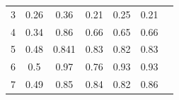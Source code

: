 \documentclass[twoside,11pt]{article}
\begin{document}
\begin{table}[H]
{\begin{tabular}{|c|c|c|c|c|c|c|}
3     & 0.26                                                           & 0.36                                                                                     & 0.21                                                                               & 0.25                                                                               & 0.21                                                                               &                                                                                       \\ \cline{1-1}
4     & 0.34                                                           & 0.86                                                                                     & 0.66                                                                               & 0.65                                                                               & 0.66                                                                               &                                                                                       \\ \cline{1-1}
5     & 0.48                                                           & 0.841                                                                                    & 0.83                                                                               & 0.82                                                                               & 0.83                                                                               &                                                                                       \\ \cline{1-1}
6     & 0.5                                                            & 0.97                                                                                     & 0.76                                                                               & 0.93                                                                               & 0.93                                                                               &                                                                                       \\ \cline{1-1}
7     & 0.49                                                           & 0.85                                                                                     & 0.84                                                                               & 0.82                                                                               & 0.86                                                                               &                                                                                       \\ \cline{1-1}

\end{tabular}}
\end{table}
\end{document}
